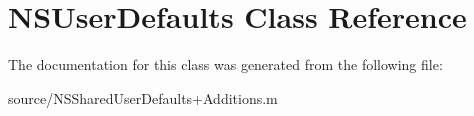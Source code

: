 \hypertarget{class_n_s_user_defaults}{
\section{NSUserDefaults Class Reference}
\label{class_n_s_user_defaults}
}


The documentation for this class was generated from the following file:\begin{DoxyCompactItemize}
\item 
source/NSSharedUserDefaults+Additions.m\end{DoxyCompactItemize}
